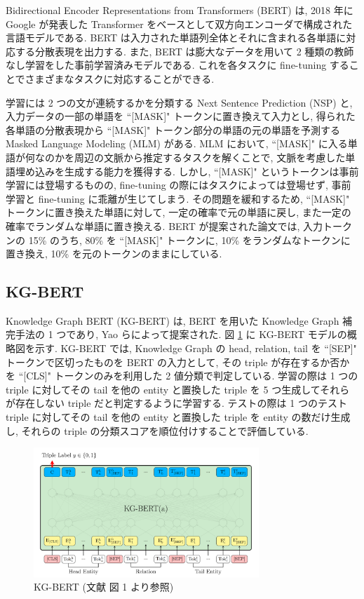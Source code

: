 \documentclass[twocolumn]{jarticle}
\begin{document}
Bidirectional Encoder Representations from Transformers (BERT) \cite{BERT} は, 2018 年に Google が発表した Transformer をベースとして双方向エンコーダで構成された言語モデルである. BERT は入力された単語列全体とそれに含まれる各単語に対応する分散表現を出力する. また, BERT は膨大なデータを用いて 2 種類の教師なし学習をした事前学習済みモデルである. これを各タスクに fine-tuning することでさまざまなタスクに対応することができる. \par
学習には 2 つの文が連続するかを分類する Next Sentence Prediction (NSP) と, 入力データの一部の単語を ``[MASK]" トークンに置き換えて入力とし, 得られた各単語の分散表現から ``[MASK]" トークン部分の単語の元の単語を予測する Masked Language Modeling (MLM) がある. MLM において, ``[MASK]" に入る単語が何なのかを周辺の文脈から推定するタスクを解くことで, 文脈を考慮した単語埋め込みを生成する能力を獲得する. しかし, ``[MASK]" というトークンは事前学習には登場するものの, fine-tuning の際にはタスクによっては登場せず, 事前学習と fine-tuning に乖離が生じてしまう. その問題を緩和するため, ``[MASK]" トークンに置き換えた単語に対して, 一定の確率で元の単語に戻し, また一定の確率でランダムな単語に置き換える. BERT が提案された論文では, 入力トークンの 15\% のうち, 80\% を ``[MASK]" トークンに, 10\% をランダムなトークンに置き換え, 10\% を元のトークンのままにしている. \par

\vspace{-1mm}
\subsection{KG-BERT}

Knowledge Graph BERT (KG-BERT) \cite{KG-BERT} は, BERT を用いた Knowledge Graph 補完手法の 1 つであり, Yao らによって提案された. 図 \ref{KG-BERT} に KG-BERT モデルの概略図を示す. KG-BERT では, Knowledge Graph の head, relation, tail を ``[SEP]" トークンで区切ったものを BERT の入力として, その triple が存在するか否かを ``[CLS]" トークンのみを利用した 2 値分類で判定している. 学習の際は 1 つの triple に対してその tail を他の entity と置換した triple を 5 つ生成してそれらが存在しない triple だと判定するように学習する. テストの際は 1 つのテスト triple に対してその tail を他の entity と置換した triple を entity の数だけ生成し, それらの triple の分類スコアを順位付けすることで評価している. \par

\begin{figure}[t]
    \centering
    \includegraphics[width=85mm]{assets/KG-BERT.png}
    \vspace{-5mm}
    \caption{KG-BERT (文献 \cite{KG-BERT} 図 1 より参照)}
    \label{KG-BERT}
\end{figure}
\end{document}
